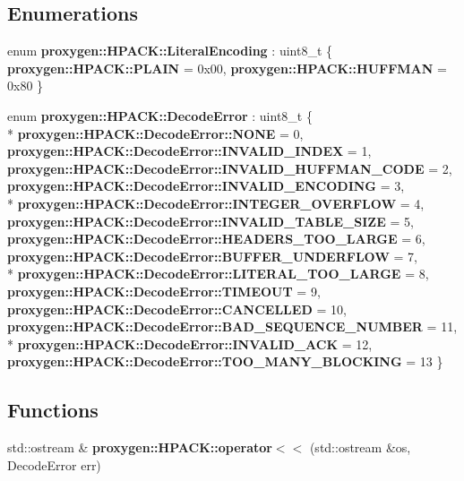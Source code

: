 \subsection*{Enumerations}
\begin{DoxyCompactItemize}
\item 
enum {\bf proxygen\+::\+H\+P\+A\+C\+K\+::\+Literal\+Encoding} \+: uint8\+\_\+t \{ {\bf proxygen\+::\+H\+P\+A\+C\+K\+::\+P\+L\+A\+IN} = 0x00, 
{\bf proxygen\+::\+H\+P\+A\+C\+K\+::\+H\+U\+F\+F\+M\+AN} = 0x80
 \}
\item 
enum {\bf proxygen\+::\+H\+P\+A\+C\+K\+::\+Decode\+Error} \+: uint8\+\_\+t \{ \\*
{\bf proxygen\+::\+H\+P\+A\+C\+K\+::\+Decode\+Error\+::\+N\+O\+NE} = 0, 
{\bf proxygen\+::\+H\+P\+A\+C\+K\+::\+Decode\+Error\+::\+I\+N\+V\+A\+L\+I\+D\+\_\+\+I\+N\+D\+EX} = 1, 
{\bf proxygen\+::\+H\+P\+A\+C\+K\+::\+Decode\+Error\+::\+I\+N\+V\+A\+L\+I\+D\+\_\+\+H\+U\+F\+F\+M\+A\+N\+\_\+\+C\+O\+DE} = 2, 
{\bf proxygen\+::\+H\+P\+A\+C\+K\+::\+Decode\+Error\+::\+I\+N\+V\+A\+L\+I\+D\+\_\+\+E\+N\+C\+O\+D\+I\+NG} = 3, 
\\*
{\bf proxygen\+::\+H\+P\+A\+C\+K\+::\+Decode\+Error\+::\+I\+N\+T\+E\+G\+E\+R\+\_\+\+O\+V\+E\+R\+F\+L\+OW} = 4, 
{\bf proxygen\+::\+H\+P\+A\+C\+K\+::\+Decode\+Error\+::\+I\+N\+V\+A\+L\+I\+D\+\_\+\+T\+A\+B\+L\+E\+\_\+\+S\+I\+ZE} = 5, 
{\bf proxygen\+::\+H\+P\+A\+C\+K\+::\+Decode\+Error\+::\+H\+E\+A\+D\+E\+R\+S\+\_\+\+T\+O\+O\+\_\+\+L\+A\+R\+GE} = 6, 
{\bf proxygen\+::\+H\+P\+A\+C\+K\+::\+Decode\+Error\+::\+B\+U\+F\+F\+E\+R\+\_\+\+U\+N\+D\+E\+R\+F\+L\+OW} = 7, 
\\*
{\bf proxygen\+::\+H\+P\+A\+C\+K\+::\+Decode\+Error\+::\+L\+I\+T\+E\+R\+A\+L\+\_\+\+T\+O\+O\+\_\+\+L\+A\+R\+GE} = 8, 
{\bf proxygen\+::\+H\+P\+A\+C\+K\+::\+Decode\+Error\+::\+T\+I\+M\+E\+O\+UT} = 9, 
{\bf proxygen\+::\+H\+P\+A\+C\+K\+::\+Decode\+Error\+::\+C\+A\+N\+C\+E\+L\+L\+ED} = 10, 
{\bf proxygen\+::\+H\+P\+A\+C\+K\+::\+Decode\+Error\+::\+B\+A\+D\+\_\+\+S\+E\+Q\+U\+E\+N\+C\+E\+\_\+\+N\+U\+M\+B\+ER} = 11, 
\\*
{\bf proxygen\+::\+H\+P\+A\+C\+K\+::\+Decode\+Error\+::\+I\+N\+V\+A\+L\+I\+D\+\_\+\+A\+CK} = 12, 
{\bf proxygen\+::\+H\+P\+A\+C\+K\+::\+Decode\+Error\+::\+T\+O\+O\+\_\+\+M\+A\+N\+Y\+\_\+\+B\+L\+O\+C\+K\+I\+NG} = 13
 \}
\end{DoxyCompactItemize}
\subsection*{Functions}
\begin{DoxyCompactItemize}
\item 
std\+::ostream \& {\bf proxygen\+::\+H\+P\+A\+C\+K\+::operator$<$$<$} (std\+::ostream \&os, Decode\+Error err)
\end{DoxyCompactItemize}
